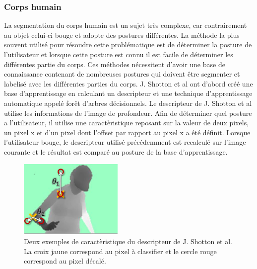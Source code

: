 \subsubsection{Corps humain}
La segmentation du corps humain est un sujet très complexe, car contrairement au objet celui-ci bouge et adopte
des postures différentes. La méthode la plus souvent utilisé pour résoudre cette problématique est de déterminer
la posture de l'utilisateur et lorsque cette posture est connu il est facile de déterminer les différentes partie
du corps. Ces méthodes nécessitent d'avoir une base de connaissance contenant de nombreuses postures qui doivent
être segmenter et labelisé avec les différentes parties du corps. J. Shotton et al\cite{kinectSegmentation} ont
d'abord créé une base d'apprentissage en calculant un descripteur
et une technique d'apprentissage automatique appelé forêt d'arbres décisionnels\cite{randomDecisionForest}. 
Le descripteur de J. Shotton et al\cite{kinectSegmentation} utilise les informations de l'image de 
profondeur. Afin de déterminer quel posture a l'utilisateur, il utilise une caractèristique reposant sur la valeur
de deux pixels, un pixel x et d'un pixel dont l'offset par rapport au pixel x a été définit.
Lorsque l'utilisateur bouge, le descripteur utilisé précédemment est recalculé sur l'image courante et le résultat 
est comparé au posture de la base d'apprentissage.\\
\begin{figure}[!h]
  \begin{center}
    \includegraphics[width=5cm]{image/shotton.png}
    \caption{Deux exemples de caractèristique du descripteur de J. Shotton et al\cite{kinectSegmentation}. 
    La croix jaune correspond au pixel à classifier et le cercle rouge correspond au pixel décalé.}
    \label{fig:pfhNeighborhood}
  \end{center}
\end{figure}

